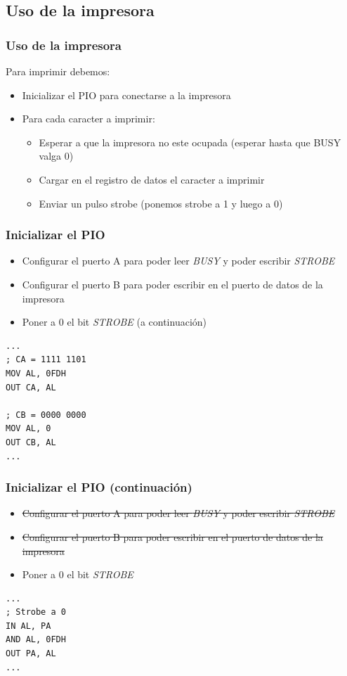 \documentclass{beamer}
\begin{document}
\subsection{Uso de la impresora}
\begin{frame}
\frametitle{Uso de la impresora}
Para imprimir debemos:
\begin{itemize}
    \item Inicializar el PIO para conectarse a la impresora
    \item Para cada caracter a imprimir:
\begin{itemize}
    \item Esperar a que la impresora no este ocupada (esperar hasta que BUSY valga 0)
    \item Cargar en el registro de datos el caracter a imprimir
    \item Enviar un pulso strobe (ponemos strobe a 1 y luego a 0)
\end{itemize}
\end{itemize}
\end{frame}

\begin{frame}[fragile]
\frametitle{Inicializar el PIO}
\begin{itemize}
    \item Configurar el puerto A para poder leer \emph{BUSY} y poder escribir \emph{STROBE}
    \item Configurar el puerto B para poder escribir en el puerto de datos de la impresora
    \item Poner a 0 el bit \emph{STROBE} (a continuación)
\end{itemize}
\begin{block}{}
\begin{verbatim}
...
; CA = 1111 1101
MOV AL, 0FDH
OUT CA, AL

; CB = 0000 0000
MOV AL, 0
OUT CB, AL
...
\end{verbatim}
\end{block}
\end{frame}

\begin{frame}[fragile]
\frametitle{Inicializar el PIO (continuación) }
\begin{itemize}
    \item \sout{Configurar el puerto A para poder leer \emph{BUSY} y poder escribir \emph{STROBE}}
    \item \sout{Configurar el puerto B para poder escribir en el puerto de datos de la impresora}
    \item Poner a 0 el bit \emph{STROBE}
\end{itemize}
\begin{block}{}
\begin{verbatim}
...
; Strobe a 0
IN AL, PA 
AND AL, 0FDH
OUT PA, AL
...
\end{verbatim}
\end{block}

\end{frame}
\end{document}

